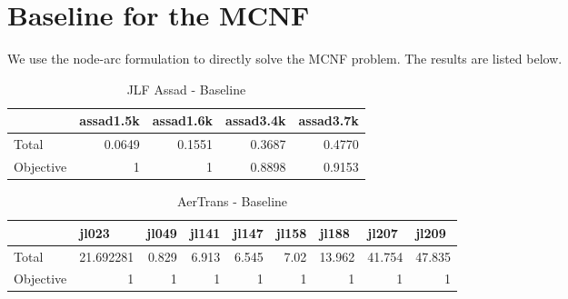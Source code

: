 \documentclass{article}
\begin{document}
\section{Baseline for the MCNF}
We use the node-arc formulation to directly solve the MCNF problem. The results are listed below.
\begin{table}[htbp]
  \centering
  \caption{JLF Assad - Baseline}
    \begin{tabular}{lrrrr}
    \toprule
          & \multicolumn{1}{l}{assad1.5k} & \multicolumn{1}{l}{assad1.6k} & \multicolumn{1}{l}{assad3.4k} & \multicolumn{1}{l}{assad3.7k} \\
              \midrule
    Total & 0.0649 & 0.1551 & 0.3687 & 0.4770 \\
    Objective & 1&1 &0.8898& 0.9153\\
    \bottomrule
    \end{tabular}%
  \label{tab:addlabel}%
\end{table}%
\begin{table}[htbp]
  \centering
  \caption{AerTrans - Baseline}
    \begin{tabular}{lrrrrrrrr}
    \toprule
          & \multicolumn{1}{l}{jl023} & \multicolumn{1}{l}{jl049} & \multicolumn{1}{l}{jl141} & \multicolumn{1}{l}{jl147} & \multicolumn{1}{l}{jl158} & \multicolumn{1}{l}{jl188} & \multicolumn{1}{l}{jl207} & \multicolumn{1}{l}{jl209} \\
          \midrule
    Total & 21.692281 & 0.829 & 6.913 & 6.545 & 7.02  & 13.962 & 41.754 & 47.835 \\
    Objective & 1& 1& 1& 1& 1& 1&1&1\\
    \bottomrule
    \end{tabular}%
  \label{tab:addlabel}%
\end{table}%





\end{document}
